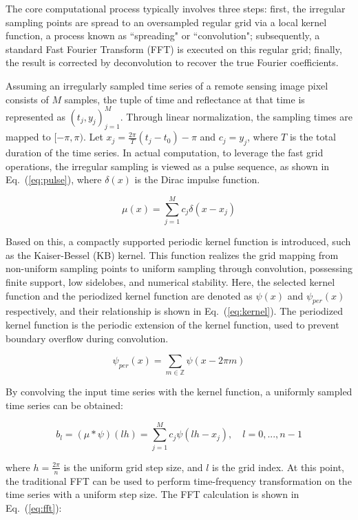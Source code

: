 \documentclass[letterpaper,journal]{IEEEtran}
\begin{document}
The core computational process typically involves three steps: first, the irregular sampling points are spread to an oversampled regular grid via a local kernel function, a process known as ``spreading" or ``convolution"; subsequently, a standard Fast Fourier Transform (FFT) is executed on this regular grid; finally, the result is corrected by deconvolution to recover the true Fourier coefficients.

Assuming an irregularly sampled time series of a remote sensing image pixel consists of $M$ samples, the tuple of time and reflectance at that time is represented as $(t_j, y_j)_{j=1}^M$. Through linear normalization, the sampling times are mapped to $[-\pi, \pi)$. Let $x_j = \frac{2\pi}{T}(t_j - t_0) - \pi$ and $c_j = y_j$, where $T$ is the total duration of the time series. In actual computation, to leverage the fast grid operations, the irregular sampling is viewed as a pulse sequence, as shown in Eq.~(\ref{eq:pulse}), where $\delta(x)$ is the Dirac impulse function.

\begin{equation}
\label{eq:pulse}
\mu(x) = \sum_{j=1}^{M} c_j \delta(x - x_j)
\end{equation}

Based on this, a compactly supported periodic kernel function is introduced, such as the Kaiser-Bessel (KB) kernel. This function realizes the grid mapping from non-uniform sampling points to uniform sampling through convolution, possessing finite support, low sidelobes, and numerical stability. Here, the selected kernel function and the periodized kernel function are denoted as $\psi(x)$ and $\psi_{per}(x)$ respectively, and their relationship is shown in Eq.~(\ref{eq:kernel}). The periodized kernel function is the periodic extension of the kernel function, used to prevent boundary overflow during convolution.

\begin{equation}
\label{eq:kernel}
\psi_{per}(x) = \sum_{m \in \mathbb{Z}} \psi(x - 2\pi m)
\end{equation}

By convolving the input time series with the kernel function, a uniformly sampled time series can be obtained:

\begin{equation}
\label{eq:conv}
b_l = (\mu * \psi)(lh) = \sum_{j=1}^{M} c_j \psi(lh - x_j), \quad l = 0, ..., n - 1
\end{equation}

where $h = \frac{2\pi}{n}$ is the uniform grid step size, and $l$ is the grid index. At this point, the traditional FFT can be used to perform time-frequency transformation on the time series with a uniform step size. The FFT calculation is shown in Eq.~(\ref{eq:fft}):
\end{document}
